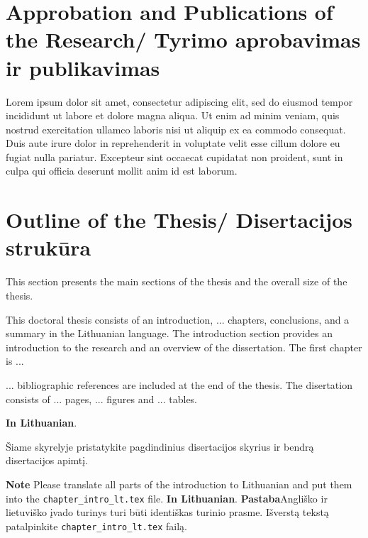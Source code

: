 \section*{Approbation and Publications of the Research/ Tyrimo aprobavimas ir publikavimas} %

Lorem ipsum dolor sit amet, consectetur adipiscing elit, sed do eiusmod tempor incididunt ut labore et dolore magna aliqua. Ut enim ad minim veniam, quis nostrud exercitation ullamco laboris nisi ut aliquip ex ea commodo consequat. Duis aute irure dolor in reprehenderit in voluptate velit esse cillum dolore eu fugiat nulla pariatur. Excepteur sint occaecat cupidatat non proident, sunt in culpa qui officia deserunt mollit anim id est laborum.


\section*{Outline of the Thesis/ Disertacijos strukūra}

This section presents the main sections of the thesis and the overall size of the thesis.

This doctoral thesis consists of an introduction, ... chapters, conclusions, and a summary in the Lithuanian language. The introduction section provides an introduction to the research and an overview of the dissertation. The first chapter is ...

... bibliographic references are included at the end of the thesis. The disertation consists of ... pages, ... figures and ... tables.


\textbf{In Lithuanian}. 

Šiame skyrelyje pristatykite pagdindinius disertacijos skyrius ir bendrą disertacijos apimtį.



\textbf{Note} Please translate all parts of the introduction to Lithuanian and put them into the \verb|chapter_intro_lt.tex| file.
\textbf{In Lithuanian}. \textbf{Pastaba}Angliško ir lietuviško įvado turinys turi būti identiškas turinio prasme. Išverstą tekstą patalpinkite \verb|chapter_intro_lt.tex| failą.